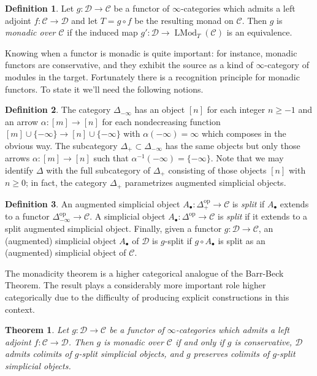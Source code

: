 \documentclass[12pt]{article}
\newtheorem{theorem}{Theorem}[subsection]
\theoremstyle{definition}
\newtheorem{definition}{Definition}[subsection]
\newcommand{\C}{\mathcal{C}}
\newcommand{\D}{\mathcal{D}}
\renewcommand{\i}{\infty}
\newcommand{\op}{\mathrm{op}}
\DeclareMathOperator{\LMod}{LMod}
\begin{document}
\begin{definition}
Let $g:\D\to\C$ be a functor of $\infty$-categories which admits a left adjoint $f:\C\to\D$ and let $T=g\circ f$ be the resulting monad on $\C$.
Then $g$ is {\em monadic over $\C$} if the induced map $g':\D\to\LMod_T(\C)$ is an equivalence.
\end{definition}

Knowing when a functor is monadic is quite important: for instance, monadic functors are conservative, and they exhibit the source as a kind of $\i$-category of modules in the target.
Fortunately there is a recognition principle for monadic functors. To state it we'll need the following notions.
\begin{definition}
The category $\Delta_{-\i}$ has an object $[n]$ for each integer $n\geq -1$ and an arrow $\alpha:[m]\to[n]$ for each nondecreasing function $[m]\cup\{-\i\}\to[n]\cup\{-\i\}$ with $\alpha(-\i)=\i$ which composes in the obvious way.
The subcategory $\Delta_+\subset\Delta_{-\i}$ has the same objects but only those arrows $\alpha:[m]\to[n]$ such that $\alpha^{-1}(-\i)=\{-\i\}$.
Note that we may identify $\Delta$ with the full subcategory of $\Delta_+$ consisting of those objects $[n]$ with $n\geq 0$; in fact, the category $\Delta_+$ parametrizes augmented simplicial objects.
\end{definition} 

\begin{definition}
An augmented simplicial object $A_\bullet:\Delta_+^{\op}\to\C$ is {\em split} if $A_\bullet$ extends to a functor $\Delta_{-\i}^{\op}\to\C$.
A simplicial object $A_\bullet:\Delta^{\op}\to\C$ is {\em split} if it extends to a split augmented simplicial object.
Finally, given a functor $g:\D\to\C$, an (augmented) simplicial object $A_\bullet$ of $\D$ is $g$-split if $g\circ A_\bullet$ is split as an (augmented) simplicial object of $\C$.
\end{definition}
The monadicity theorem is a higher categorical analogue of the Barr-Beck Theorem.
The result plays a considerably more important role higher categorically due to the difficulty of producing explicit constructions in this context.
\begin{theorem}{\em \cite[Theorem 4.7.3.5]{HA}}\label{thm:bbl}
Let $g:\D\to\C$ be a functor of $\infty$-categories which admits a left adjoint $f:\C\to\D$.
Then $g$ is monadic over $\C$ if and only if $g$ is conservative, $\D$ admits colimits of $g$-split simplicial objects, and $g$ preserves colimits of $g$-split simplicial objects.
\end{theorem}
\end{document}
